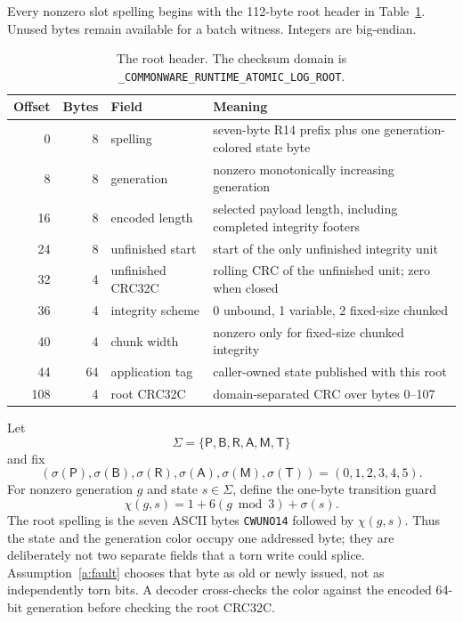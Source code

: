 \documentclass[10pt,twocolumn]{article}
\theoremstyle{remark}
\newcommand{\code}[1]{\texttt{#1}}
\newcommand{\Root}{\mathsf{R}}
\newcommand{\Prepared}{\mathsf{B}}
\newcommand{\Materialized}{\mathsf{M}}
\newcommand{\Tombstone}{\mathsf{T}}
\newcommand{\Abort}{\mathsf{A}}
\begin{document}
Every nonzero slot spelling begins with the 112-byte root header in Table~\ref{tab:root}. Unused bytes remain
available for a batch witness. Integers are big-endian.

\begin{table}[t]
\centering
\small
\begin{tabularx}{\textwidth}{@{}r r l X@{}}
\toprule
Offset & Bytes & Field & Meaning \\
\midrule
0   & 8  & spelling & seven-byte R14 prefix plus one generation-colored state byte \\
8   & 8  & generation & nonzero monotonically increasing generation \\
16  & 8  & encoded length & selected payload length, including completed integrity footers \\
24  & 8  & unfinished start & start of the only unfinished integrity unit \\
32  & 4  & unfinished CRC32C & rolling CRC of the unfinished unit; zero when closed \\
36  & 4  & integrity scheme & 0 unbound, 1 variable, 2 fixed-size chunked \\
40  & 4  & chunk width & nonzero only for fixed-size chunked integrity \\
44  & 64 & application tag & caller-owned state published with this root \\
108 & 4  & root CRC32C & domain-separated CRC over bytes 0--107 \\
\bottomrule
\end{tabularx}
\caption{The root header. The checksum domain is
\code{\_COMMONWARE\_RUNTIME\_ATOMIC\_LOG\_ROOT}.}
\label{tab:root}
\end{table}

Let
\[
  \Sigma=\{\mathsf{P},\Prepared,\Root,\Abort,\Materialized,\Tombstone\}
\]
and fix
\[
  (\sigma(\mathsf{P}),\sigma(\Prepared),\sigma(\Root),\sigma(\Abort),
    \sigma(\Materialized),\sigma(\Tombstone))
    =(0,1,2,3,4,5).
\]
For nonzero generation $g$ and
state $s\in\Sigma$, define the one-byte transition guard
\[
  \chi(g,s)=1+6(g\bmod 3)+\sigma(s).
\]
The root spelling is the seven ASCII bytes \code{CWUNO14} followed by $\chi(g,s)$.  Thus the state
and the generation color occupy one addressed byte; they are deliberately not two separate fields
that a torn write could splice. Assumption~\ref{a:fault} chooses that byte as old or newly issued,
not as independently torn bits. A decoder cross-checks the color against the encoded 64-bit
generation before checking the root CRC32C.
\end{document}

